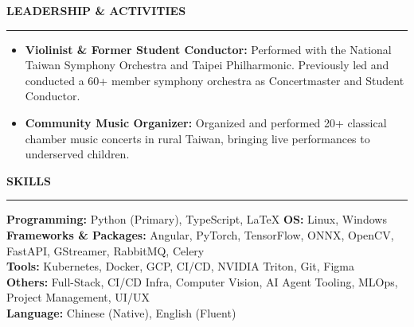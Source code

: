 \documentclass[10pt,a4paper]{article}
\newcommand{\SectionHeader}[1]{%
  \vspace{0.26cm}
  {\large\bfseries\color{customblue}\MakeUppercase{#1}}\par
  \vspace{-0.2cm}
  \noindent\textcolor{customblue}{\rule{\textwidth}{0.6pt}}\par
  \vspace{0.1cm}
}
\begin{document}
\SectionHeader{Leadership \& Activities}

\vspace{-0.13cm}
\begin{itemize}[leftmargin=0.45cm, labelsep=0.22cm, itemsep=0.05cm, topsep=0.06cm, parsep=0pt]
  \fontsize{9.15pt}{11.55pt}\selectfont
  \item \textbf{Violinist \& Former Student Conductor:} Performed with the National Taiwan Symphony Orchestra and Taipei Philharmonic. Previously led and conducted a 60+ member symphony orchestra as Concertmaster and Student Conductor.
  \item \textbf{Community Music Organizer:} Organized and performed 20+ classical chamber music concerts in rural Taiwan, bringing live performances to underserved children.
\end{itemize}
\vspace{-0.08cm}

\SectionHeader{Skills}

{\fontsize{9.15pt}{11.55pt}\selectfont
\noindent\textbf{Programming:} Python (Primary), TypeScript, \LaTeX \hspace{0.45cm} \textbf{OS:} Linux, Windows\\[0.05cm]
\textbf{Frameworks \& Packages:} Angular, PyTorch, TensorFlow, ONNX, OpenCV, FastAPI, GStreamer, RabbitMQ, Celery\\[0.05cm]
\textbf{Tools:} Kubernetes, Docker, GCP, CI/CD, NVIDIA Triton, Git, Figma\\[0.05cm]
\textbf{Others:} Full-Stack, CI/CD Infra, Computer Vision, AI Agent Tooling, MLOps, Project Management, UI/UX\\[0.05cm]
\textbf{Language:} Chinese (Native), English (Fluent)
}
\end{document}
